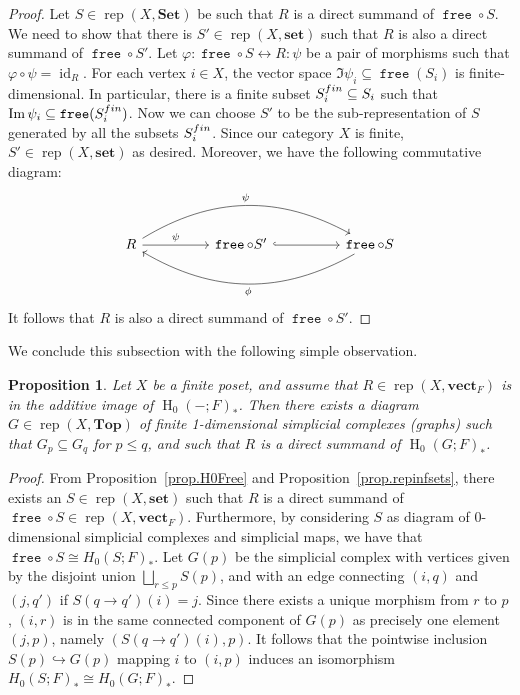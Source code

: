 \documentclass[a4paper]{amsart}
\theoremstyle{plain}
\newtheorem{proposition}[theorem]{Proposition}
\theoremstyle{definition}
\theoremstyle{remark}
\newcommand{\funct}[1]{\operatorname{\mathtt{#1}}}
\newcommand{\Top}{\mathbf{Top}}
\newcommand{\Set}{\mathbf{Set}}
\newcommand{\set}{\mathbf{set}}
\newcommand{\vectF}{\mathbf{vect}_F}
\DeclareMathOperator{\rep}{rep}
\begin{document}
\begin{proof}
Let \( S \in \rep(X, \Set ) \) be such that \( R \) is a direct summand of \( \funct{free} \circ S \). We need to show that there is \( S' \in \rep(X, \set ) \) such that \( R \) is also a direct summand of \( \funct{free} \circ S' \). Let \( \varphi \colon \funct{free} \circ S \longleftrightarrow R \colon \psi \) be a pair of morphisms such that \( \varphi \circ \psi = \operatorname{id}_R \). For each vertex \( i \in X \), the vector space \( \Im \psi_i \subseteq \funct{free}(S_i) \) is finite-dimensional. In particular, there is a finite subset \( S^{\rm fin}_i \subseteq S_i \) such that \( \Im \psi_i \subseteq \funct{free}(S^{\rm fin}_i) \). Now we can choose \( S' \) to be the sub-representation of \( S \) generated by all the subsets \( S^{\rm fin}_i \). Since our category \( X \) is finite, \( S' \in \rep(X, \set ) \) as desired. Moreover, we have the following commutative diagram:
\[\begin{tikzcd}
R \ar[rrrr, bend left, "\psi"] \ar[rr, "\psi"]& & \funct{free} \circ S' \arrow[hookrightarrow]{rr}& & \funct{free} \circ S \ar[llll, bend left, "\phi"]
\end{tikzcd}
\]
It follows that \( R \) is also a direct summand of \( \funct{free} \circ S' \).
\end{proof}
We conclude this subsection with the following simple observation.
\begin{proposition}
\label{prop.graphs}
Let $X$ be a finite poset, and assume that $R\in \rep(X, \vectF)$ is in the additive image of $\operatorname{H}_0(-;F)_*$. Then there exists a diagram $G\in\rep(X,\Top)$ of finite 1-dimensional simplicial complexes (graphs) such that $G_p\subseteq G_q$ for $p\leq q$, and such that $R$ is a direct summand of $\operatorname{H}_0(G; F)_*$.
\end{proposition}
\begin{proof}
From Proposition~\ref{prop.H0Free} and Proposition~\ref{prop.repinfsets}, there exists an $S\in \rep(X, \set)$ such that $R$ is a direct summand of $\funct{free} \circ S \in \rep(X, \vectF)$. Furthermore, by considering $S$ as diagram of 0-dimensional simplicial complexes and simplicial maps, we have that $\funct{free} \circ S \cong H_0(S;F)_*$. Let $G(p)$ be the simplicial complex with vertices given by the disjoint union $\bigsqcup_{r\leq p} S(p)$, and with an edge connecting $(i,q)$ and $(j,q')$ if $S(q\to q')(i)=j$. Since there exists a unique morphism from $r$ to $p$, $(i,r)$ is in the same connected component of $G(p)$ as precisely one element $(j,p)$, namely $(S(q\to q')(i), p)$. It follows that the pointwise inclusion $S(p) \hookrightarrow G(p)$ mapping $i$ to $(i, p)$ induces an isomorphism $H_0(S;F)_* \cong H_0(G;F)_*$. 
\end{proof}
\end{document}
